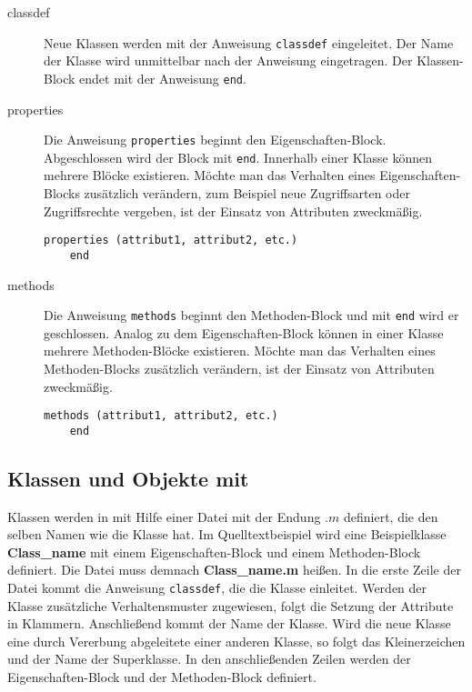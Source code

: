 \begin{description}

	\item[classdef] Neue Klassen werden mit der Anweisung
	\lstinline$classdef$ eingeleitet. Der Name der Klasse wird unmittelbar
	nach der Anweisung eingetragen. Der Klassen-Block endet mit der
	Anweisung \lstinline$end$.
	\item[properties] Die Anweisung \lstinline$properties$ beginnt den
	Eigenschaften-Block. Abgeschlossen wird der Block mit \lstinline$end$.
	Innerhalb einer Klasse k\"onnen mehrere Bl\"ocke existieren. M\"ochte
	man das Verhalten eines Eigenschaften-Blocks zus\"atzlich ver\"andern,
	zum Beispiel neue Zugriffsarten oder Zugriffsrechte vergeben, ist der
	Einsatz von Attributen zweckm\"a\ss ig.
	\begin{lstlisting}[frame=none]
	properties (attribut1, attribut2, etc.)
	end
	\end{lstlisting}
	\item[methods] Die Anweisung \lstinline$methods$ beginnt den
	Methoden-Block und mit \lstinline$end$ wird er geschlossen. Analog zu
	dem Eigenschaften-Block k\"onnen in einer Klasse mehrere
	Methoden-Bl\"ocke existieren. M\"ochte man das Verhalten eines
	Methoden-Blocks zus\"atzlich ver\"andern, ist der Einsatz von Attributen
	zweckm\"a\ss ig.
	\begin{lstlisting}[frame=none]
	methods (attribut1, attribut2, etc.)
	end
	\end{lstlisting}


\end{description}


\subsection*{Klassen und Objekte mit \matlab}

Klassen werden in \matlab mit Hilfe einer Datei mit der Endung $.m$ definiert,
die den selben Namen wie die Klasse hat. Im Quelltextbeispiel
 wird eine Beispielklasse \textbf{Class\_name} mit
einem Eigenschaften-Block und einem Methoden-Block definiert. Die Datei muss
demnach \textbf{Class\_name.m} hei\ss en. In die erste Zeile der Datei kommt die
Anweisung \lstinline$classdef$, die die Klasse einleitet. Werden der Klasse
zus\"atzliche Verhaltensmuster zugewiesen, folgt die Setzung der Attribute in
Klammern. Anschlie\ss end kommt der Name der Klasse. Wird die neue Klasse eine
durch Vererbung abgeleitete einer anderen Klasse, so folgt das Kleinerzeichen
und der Name der Superklasse. In den anschlie\ss enden Zeilen werden der
Eigenschaften-Block und der Methoden-Block definiert.

